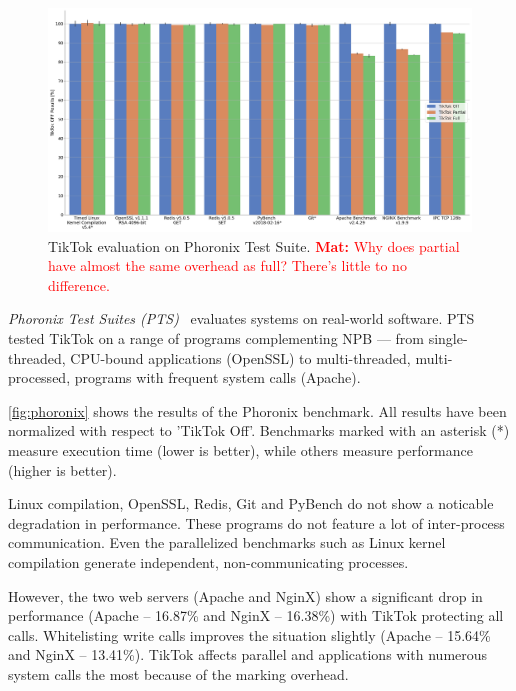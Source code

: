 \documentclass[conference]{IEEEtran}
\newcommand{\mat}[1]{\textcolor{red}{\textbf{Mat:} #1}}
\newcommand{\sysname}{TikTok}
\begin{document}
\begin{figure}[]
  \centering
  \includegraphics[width=\linewidth]{graphs/phoronix.png}
  \caption{\sysname{} evaluation on Phoronix Test Suite.
\mat{Why does partial have almost the same overhead as full? There's little to
no difference.}
}
  \label{fig:phoronix}
\end{figure}

\emph{Phoronix Test Suites (PTS)}~\cite{pts} evaluates systems on real-world
software. PTS tested \sysname{} on a range of programs complementing NPB ---
from single-threaded, CPU-bound applications (OpenSSL) to multi-threaded,
multi-processed, programs with frequent system calls (Apache).

\autoref{fig:phoronix} shows the results of the Phoronix benchmark. All results
have been normalized with respect to '\sysname{} Off'. Benchmarks marked
with an asterisk (*) measure execution time (lower is better), while others
measure performance (higher is better).

Linux compilation, OpenSSL, Redis, Git and PyBench do not show a noticable
degradation in performance. These programs do not feature a lot of inter-process
communication. Even the parallelized benchmarks such as Linux kernel compilation
generate independent, non-communicating processes.

However, the two web servers (Apache and NginX) show a significant drop in
performance (Apache -- 16.87\% and NginX -- 16.38\%) with \sysname{} protecting
all calls. Whitelisting write calls improves the situation slightly (Apache --
15.64\% and NginX -- 13.41\%). \sysname{} affects parallel and applications with
numerous system calls the most because of the marking overhead.
\end{document}
